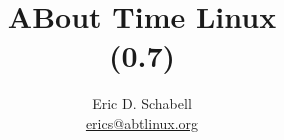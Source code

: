 \documentclass[a4paper]{article}
\begin{document}
\title{ABout Time Linux \\ (0.7)}

\author{Eric D. Schabell \\ \url{erics@abtlinux.org}}

\maketitle









  
\end{document}
